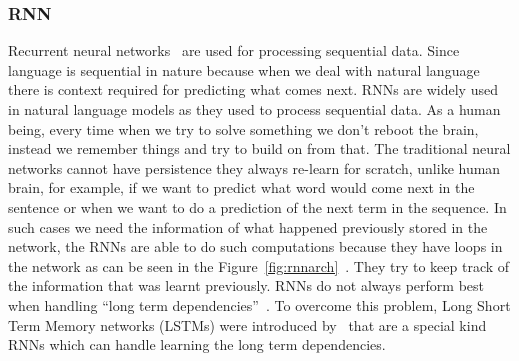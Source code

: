 \subsubsection{RNN}
Recurrent neural networks~\cite{rumelhart1988learning} are used for processing sequential data. Since language is sequential in nature because when we deal with natural language there is context required for predicting what comes next. RNNs are widely used in natural language models as they used to process sequential data.
As a human being, every time when we try to solve something we don't reboot the brain, instead we remember things and try to build on from that. The traditional neural networks cannot have persistence they always re-learn for scratch, unlike human brain, for example, if we want to predict what word would come next in the sentence or when we want to do a prediction of the next term in the sequence. In such cases we need the information of what happened previously stored in the network, the RNNs are able to do such computations because they have loops in the network as can be seen in the Figure~\ref{fig:rnnarch}~\cite{chung2015recurrent}. They try to keep track of the information that was learnt previously. 
RNNs do not always perform best when handling ``long term dependencies''~\cite{bengio1994learning}. To overcome this problem, Long Short Term Memory networks (LSTMs) were introduced by~\cite{hochreiter1997long} that are a special kind RNNs which can handle learning the long term dependencies. 

